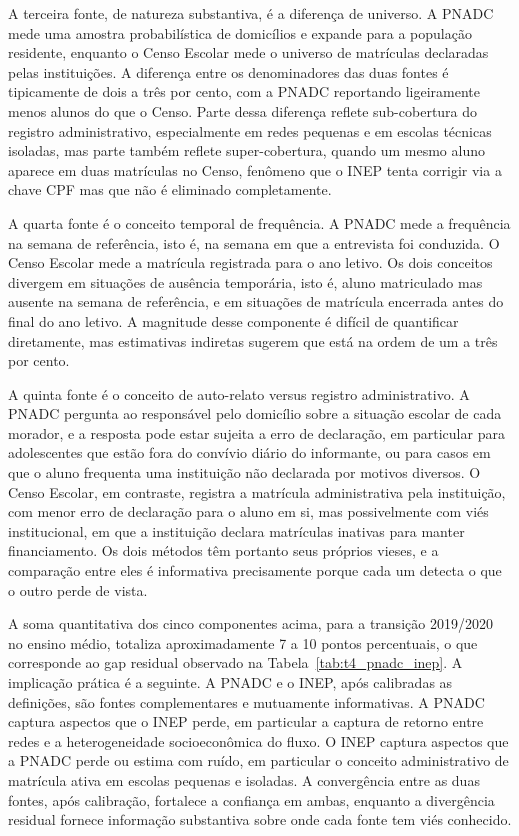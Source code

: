 A terceira fonte, de natureza substantiva, é a diferença de
universo. A PNADC mede uma amostra probabilística de domicílios
e expande para a população residente, enquanto o Censo Escolar
mede o universo de matrículas declaradas pelas instituições. A
diferença entre os denominadores das duas fontes é tipicamente
de dois a três por cento, com a PNADC reportando ligeiramente
menos alunos do que o Censo. Parte dessa diferença reflete
sub-cobertura do registro administrativo, especialmente em
redes pequenas e em escolas técnicas isoladas, mas parte
também reflete super-cobertura, quando um mesmo aluno aparece
em duas matrículas no Censo, fenômeno que o INEP tenta corrigir
via a chave CPF mas que não é eliminado completamente.

A quarta fonte é o conceito temporal de frequência. A PNADC
mede a frequência na semana de referência, isto é, na semana em
que a entrevista foi conduzida. O Censo Escolar mede a
matrícula registrada para o ano letivo. Os dois conceitos
divergem em situações de ausência temporária, isto é, aluno
matriculado mas ausente na semana de referência, e em
situações de matrícula encerrada antes do final do ano letivo.
A magnitude desse componente é difícil de quantificar
diretamente, mas estimativas indiretas sugerem que está na
ordem de um a três por cento.

A quinta fonte é o conceito de auto-relato versus registro
administrativo. A PNADC pergunta ao responsável pelo domicílio
sobre a situação escolar de cada morador, e a resposta pode
estar sujeita a erro de declaração, em particular para
adolescentes que estão fora do convívio diário do informante,
ou para casos em que o aluno frequenta uma instituição não
declarada por motivos diversos. O Censo Escolar, em contraste,
registra a matrícula administrativa pela instituição, com
menor erro de declaração para o aluno em si, mas possivelmente
com viés institucional, em que a instituição declara
matrículas inativas para manter financiamento. Os dois métodos
têm portanto seus próprios vieses, e a comparação entre eles é
informativa precisamente porque cada um detecta o que o outro
perde de vista.

A soma quantitativa dos cinco componentes acima, para a
transição 2019/2020 no ensino médio, totaliza aproximadamente
7 a 10 pontos percentuais, o que corresponde ao gap residual
observado na Tabela~\ref{tab:t4_pnadc_inep}. A implicação
prática é a seguinte. A PNADC e o INEP, após calibradas as
definições, são fontes complementares e mutuamente
informativas. A PNADC captura aspectos que o INEP perde, em
particular a captura de retorno entre redes e a heterogeneidade
socioeconômica do fluxo. O INEP captura aspectos que a PNADC
perde ou estima com ruído, em particular o conceito
administrativo de matrícula ativa em escolas pequenas e
isoladas. A convergência entre as duas fontes, após
calibração, fortalece a confiança em ambas, enquanto a
divergência residual fornece informação substantiva sobre onde
cada fonte tem viés conhecido.
